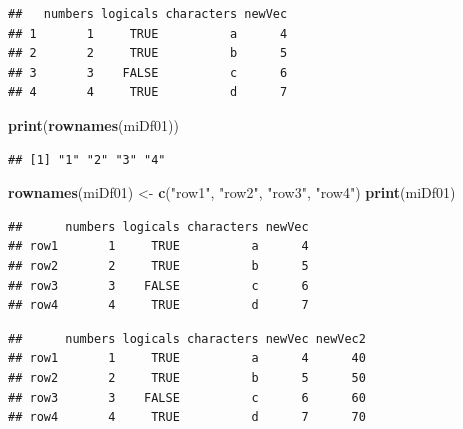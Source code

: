 \documentclass[
]{book}
\newenvironment{Shaded}{\begin{snugshade}}{\end{snugshade}}
\newcommand{\DecValTok}[1]{\textcolor[rgb]{0.00,0.00,0.81}{#1}}
\newcommand{\KeywordTok}[1]{\textcolor[rgb]{0.13,0.29,0.53}{\textbf{#1}}}
\newcommand{\NormalTok}[1]{#1}
\newcommand{\OperatorTok}[1]{\textcolor[rgb]{0.81,0.36,0.00}{\textbf{#1}}}
\newcommand{\StringTok}[1]{\textcolor[rgb]{0.31,0.60,0.02}{#1}}
\begin{document}
\begin{verbatim}
##   numbers logicals characters newVec
## 1       1     TRUE          a      4
## 2       2     TRUE          b      5
## 3       3    FALSE          c      6
## 4       4     TRUE          d      7
\end{verbatim}

\begin{Shaded}
\begin{Highlighting}[]
\KeywordTok{print}\NormalTok{(}\KeywordTok{rownames}\NormalTok{(miDf01))}
\end{Highlighting}
\end{Shaded}

\begin{verbatim}
## [1] "1" "2" "3" "4"
\end{verbatim}

\begin{Shaded}
\begin{Highlighting}[]
\KeywordTok{rownames}\NormalTok{(miDf01) <-}\StringTok{ }\KeywordTok{c}\NormalTok{(}\StringTok{"row1"}\NormalTok{, }\StringTok{"row2"}\NormalTok{, }\StringTok{"row3"}\NormalTok{, }\StringTok{"row4"}\NormalTok{)}
\KeywordTok{print}\NormalTok{(miDf01)}
\end{Highlighting}
\end{Shaded}

\begin{verbatim}
##      numbers logicals characters newVec
## row1       1     TRUE          a      4
## row2       2     TRUE          b      5
## row3       3    FALSE          c      6
## row4       4     TRUE          d      7
\end{verbatim}

\begin{Shaded}
\end{Shaded}

\begin{verbatim}
##      numbers logicals characters newVec newVec2
## row1       1     TRUE          a      4      40
## row2       2     TRUE          b      5      50
## row3       3    FALSE          c      6      60
## row4       4     TRUE          d      7      70
\end{verbatim}
\end{document}
